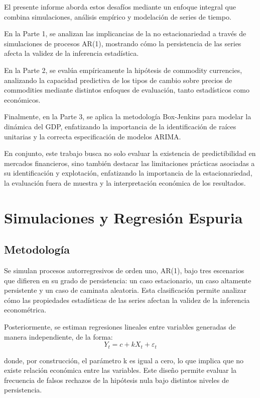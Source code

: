 \documentclass[11pt,a4paper]{article}
\begin{document}
	El presente informe aborda estos desafíos mediante un enfoque integral que combina simulaciones, análisis empírico y modelación de series de tiempo. 

	En la Parte 1, se analizan las implicancias de la no estacionariedad a través de simulaciones de procesos AR(1), mostrando cómo la persistencia de las series afecta la validez de la inferencia estadística. 

	En la Parte 2, se evalúa empíricamente la hipótesis de commodity currencies, analizando la capacidad predictiva de los tipos de cambio sobre precios de commodities mediante distintos enfoques de evaluación, tanto estadísticos como económicos.

 	Finalmente, en la Parte 3, se aplica la metodología Box-Jenkins para modelar la dinámica del GDP, enfatizando la importancia de la identificación de raíces unitarias y la correcta especificación de modelos ARIMA.
 
	En conjunto, este trabajo busca no solo evaluar la existencia de predictibilidad en mercados financieros, sino también destacar las limitaciones prácticas asociadas a su identificación y explotación, enfatizando la importancia de la estacionariedad, la evaluación fuera de muestra y la interpretación económica de los resultados.

	\newpage
	\section{Simulaciones y Regresión Espuria}
	
	\subsection{Metodología}
	
	Se simulan procesos autorregresivos de orden uno, AR(1), bajo tres escenarios que difieren en su grado de persistencia: un caso estacionario, un caso altamente persistente y un caso de caminata aleatoria. Esta clasificación permite analizar cómo las propiedades estadísticas de las series afectan la validez de la inferencia econométrica.
	
	Posteriormente, se estiman regresiones lineales entre variables generadas de manera independiente, de la forma:	
	\begin{equation}
		Y_t = c + k X_t + \varepsilon_t
	\end{equation}
	
	donde, por construcción, el parámetro k es igual a cero, lo que implica que no existe relación económica entre las variables. Este diseño permite evaluar la frecuencia de falsos rechazos de la hipótesis nula bajo distintos niveles de persistencia.
	
\end{document}
